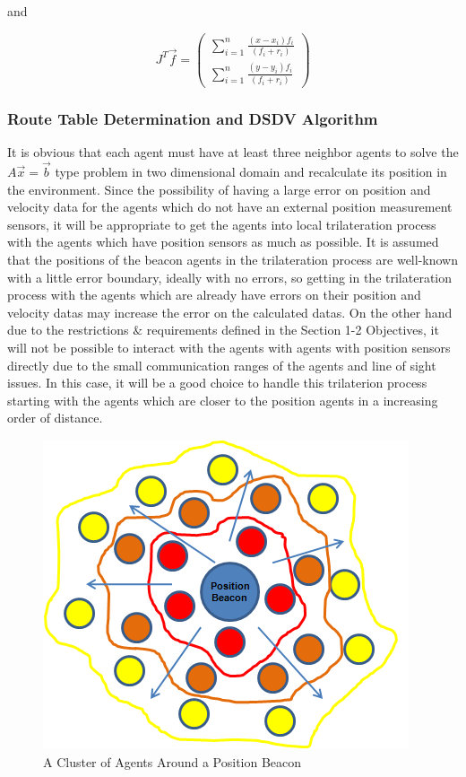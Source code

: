 \documentclass[twoside]{article}
\begin{document}
and 

\begin{equation}
  J^T\vec{f} = \left(\begin{matrix}
 \sum_{i=1}^{n}\frac{(x-x_i)f_i}{(f_i+r_i)} \\
  \sum_{i=1}^{n}\frac{(y-y_i)f_i}{(f_i+r_i)}
  \end{matrix}\right)
\end{equation}
	
	
	\subsubsection{ Route Table Determination and  DSDV Algorithm}
	
	It is obvious that each agent must have at least three neighbor agents to solve the $A\vec{x}=\vec{b}$ type problem in two dimensional domain and recalculate its position in the environment. Since the possibility of having a large error on position and velocity data for the agents which do not have an external position measurement sensors, it will be appropriate to get the agents into local trilateration process with the agents which have position sensors as much as possible. It is assumed that the positions of the beacon agents in the trilateration process are well-known with a little error boundary, ideally with no errors, so getting in the trilateration process with the agents which are already have errors on their position and velocity datas may increase the error on the calculated datas. On the other hand due to the restrictions $\&$ requirements defined in the Section 1-2 Objectives, it will not be possible to interact with the agents with agents with position sensors directly due to the small communication ranges of the agents and line of sight issues. In this case, it will be a good choice to handle this trilaterion process starting with the agents which are closer to the position agents in a increasing order of distance. 
	
\begin{figure}[H]
	\caption{A Cluster of Agents Around a Position Beacon}
	\centering
	\includegraphics[scale = 0.65]{position_beacon}
\end{figure}
	
\end{document}
